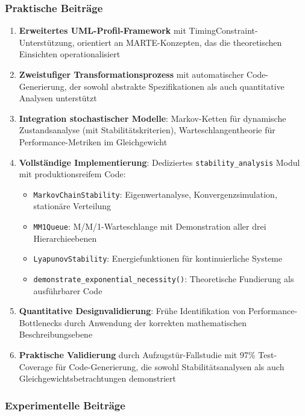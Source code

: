 ﻿\documentclass[a4paper,12pt]{scrreprt}
\theoremstyle{definition}
\begin{document}
\subsubsection{Praktische Beiträge}

\begin{enumerate}
	\item[-] \textbf{Erweitertes UML-Profil-Framework} mit TimingConstraint-Unterstützung, orientiert an MARTE-Konzepten, das die theoretischen Einsichten operationalisiert
	
	\item[-] \textbf{Zweistufiger Transformationsprozess} mit automatischer Code-Generierung, der sowohl abstrakte Spezifikationen als auch quantitative Analysen unterstützt
	
	\item[-] \textbf{Integration stochastischer Modelle}: Markov-Ketten für dynamische Zustandsanalyse (mit Stabilitätskriterien), Warteschlangentheorie für Performance-Metriken im Gleichgewicht
	
	\item[-] \textbf{Vollständige Implementierung}: Dediziertes \texttt{stability\_analysis} Modul mit produktionsreifem Code:
	\begin{itemize}
		\item[-] \texttt{MarkovChainStability}: Eigenwertanalyse, Konvergenzsimulation, stationäre Verteilung
		\item[-] \texttt{MM1Queue}: M/M/1-Warteschlange mit Demonstration aller drei Hierarchieebenen
		\item[-] \texttt{LyapunovStability}: Energiefunktionen für kontinuierliche Systeme
		\item[-] \texttt{demonstrate\_exponential\_necessity()}: Theoretische Fundierung als ausführbarer Code
	\end{itemize}
	
	\item[-] \textbf{Quantitative Designvalidierung}: Frühe Identifikation von Performance-Bottle\-necks durch Anwendung der korrekten mathematischen Beschreibungsebene
	
	\item[-] \textbf{Praktische Validierung} durch Aufzugstür-Fallstudie mit 97\% Test-Coverage für Code-Generierung, die sowohl Stabilitätsanalysen als auch Gleichgewichtsbetrachtungen demonstriert
\end{enumerate}

\subsubsection{Experimentelle Beiträge}
\end{document}
